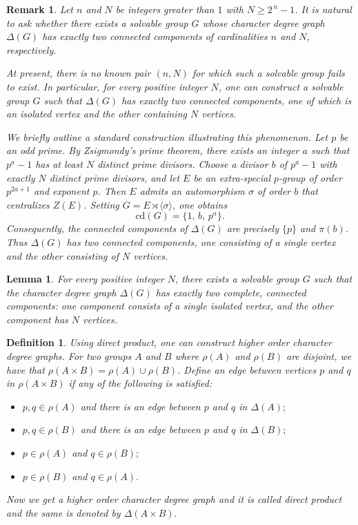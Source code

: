 \documentclass[11pt]{amsart}
\newtheorem{lem}[thm]{\bf Lemma}
\newtheorem{defn}[thm]{\bf Definition}
\newtheorem{rem}[thm]{\bf Remark}
\begin{document}
\begin{rem}{\cite{Lewis2008}}\label{rem:question}
Let $n$ and $N$ be integers greater than $1$ with $N \ge 2^{\,n}-1$. It is natural to ask whether there exists a solvable group $G$ whose character degree graph $\Delta(G)$ has exactly two connected components of cardinalities $n$ and $N$, respectively.

At present, there is no known pair $(n,N)$ for which such a solvable group fails to exist. In particular, for every positive integer $N$, one can construct a solvable group $G$ such that $\Delta(G)$ has exactly two connected components, one of which is an isolated vertex and the other containing $N$ vertices.

We briefly outline a standard construction illustrating this phenomenon. Let $p$ be an odd prime. By Zsigmondy’s prime theorem, there exists an integer $a$ such that $p^{a}-1$ has at least $N$ distinct prime divisors. Choose a divisor $b$ of $p^{a}-1$ with exactly $N$ distinct prime divisors, and let $E$ be an extra-special $p$-group of order $p^{2a+1}$ and exponent $p$. Then $E$ admits an automorphism $\sigma$ of order $b$ that centralizes $Z(E)$. Setting $G = E \rtimes \langle \sigma \rangle$, one obtains
\[
\mathrm{cd}(G) = \{1,\, b,\, p^{a}\}.
\]
Consequently, the connected components of $\Delta(G)$ are precisely $\{p\}$ and $\pi(b)$. Thus $\Delta(G)$ has two connected components, one consisting of a single vertex and the other consisting of $N$ vertices.
\end{rem}

\begin{lem}\label{lem:two-components}
\textnormal{\cite[Lemma~2.6]{Lewis2008}}
For every positive integer $N$, there exists a solvable group $G$ such that the character degree graph $\Delta(G)$ has exactly two complete, connected components: one component consists of a single isolated vertex, and the other component has $N$ vertices.
\end{lem}

\begin{defn}\cite[p. 502]{Bissler2019a}\label{direct product} Using direct product, one can construct higher order character degree graphs. For two groups $A$ and $B$ where $\rho(A)$ and  $\rho(B)$ are disjoint,  we have that $\rho(A\times B) =  \rho(A) \cup \rho(B)$.  Define an edge between vertices $p$ and $q$ in $\rho(A\times B)$  if any of the following is satisfied:
\begin{itemize}
\item [\rm (i)] $p , q\in \rho (A)$ and there is an edge between $p$ and $q$ in $\Delta(A);$
\item [\rm (ii)] $p, q \in \rho (B)$ and there is an edge between $p$ and $q$ in $\Delta(B);$
\item [\rm (iii)] $p\in\rho (A)$ and $q\in\rho (B);$
\item [\rm (iv)]  $p \in\rho (B) $ and $q\in\rho (A).$ 
\end{itemize}
Now we get a higher order character degree graph and it is called direct product and the same is denoted by $\Delta(A\times B).$
\end{defn}
\end{document}
